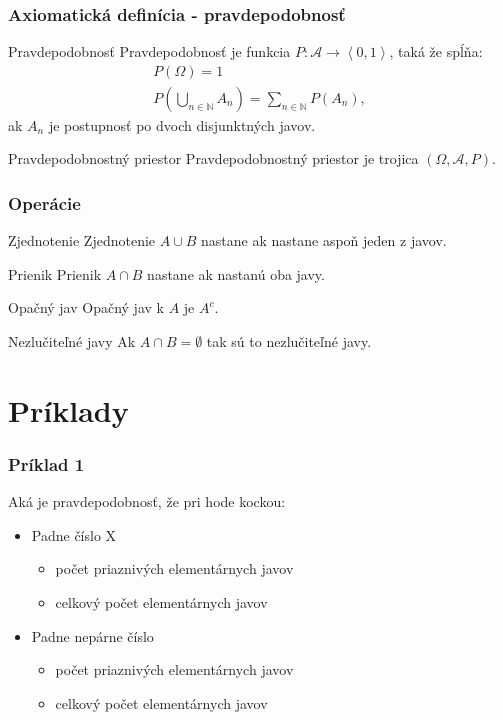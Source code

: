 \documentclass{beamer}
\begin{document}
\begin{frame}
\frametitle{Axiomatická definícia - pravdepodobnosť}

\begin{block}{Pravdepodobnosť}
Pravdepodobnosť je funkcia $P: \mathcal{A} \rightarrow \left<0,1\right>$, taká že spĺňa:
\begin{gather}
P(\Omega) = 1 \\
P\left(\bigcup_{n \in \mathbb{N}} A_n\right) = \sum_{n \in \mathbb{N}} P(A_n),
\end{gather}
\centering
ak $A_n$ je postupnosť po dvoch disjunktných javov.
\end{block}

\begin{block}{Pravdepodobnostný priestor}
Pravdepodobnostný priestor je trojica $\left(\Omega, \mathcal{A}, P \right)$.
\end{block}
\end{frame}


\begin{frame}
\frametitle{Operácie}

\begin{block}{Zjednotenie}
Zjednotenie $A \cup B$ nastane ak nastane aspoň jeden z javov.
\end{block}

\begin{block}{Prienik}
Prienik $A \cap B$ nastane ak nastanú oba javy.
\end{block}

\begin{block}{Opačný jav}
Opačný jav k $A$ je $A^c$.
\end{block}

\begin{block}{Nezlučiteľné javy}
Ak $A \cap B = \emptyset$ tak sú to nezlučiteľné javy.
\end{block}
\end{frame}

\section{Príklady}

\begin{frame}
\frametitle{Príklad 1}
Aká je pravdepodobnosť, že pri hode kockou:
\begin{itemize}
\item Padne číslo X 
\begin{itemize}
\item počet priaznivých elementárnych javov  
\item celkový počet elementárnych javov  
\end{itemize}
\item Padne nepárne číslo 
\begin{itemize}
\item počet priaznivých elementárnych javov 
\item celkový počet elementárnych javov 
\end{itemize}
\end{itemize}
\end{frame}
\end{document}
